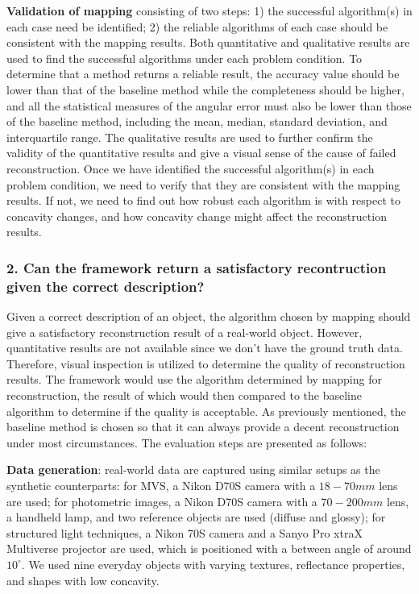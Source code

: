 \noindent\textbf{Validation of mapping}  consisting of two steps: 1) the successful algorithm(s) in each case need be identified; 2) the reliable algorithms of each case should be consistent with the mapping results. Both quantitative and qualitative results are used to find the successful algorithms under each problem condition. To determine that a method returns a reliable result, the accuracy value should be lower than that of the baseline method while the completeness should be higher, and all the statistical measures of the angular error must also be lower than those of the baseline method, including the mean, median, standard deviation, and interquartile range. The qualitative results are used to further confirm the validity of the quantitative results and give a visual sense of the cause of failed reconstruction. Once we have identified the successful algorithm(s) in each problem condition, we need to verify that they are consistent with the mapping results. If not, we need to find out how robust each algorithm is with respect to concavity changes, and how concavity change might affect the reconstruction results.

\subsubsection{2. Can the framework return a satisfactory recontruction given the correct description?}
Given a correct description of an object, the algorithm chosen by mapping should give a satisfactory reconstruction result of a real-world object. However, quantitative results are not available since we don't have the ground truth data. Therefore, visual inspection is utilized to determine the quality of reconstruction results. The framework would use the algorithm determined by mapping for reconstruction, the result of which would then compared to the baseline algorithm to determine if the quality is acceptable. As previously mentioned, the baseline method is chosen so that it can always provide a decent reconstruction under most circumstances. The evaluation steps are presented as follows:

\noindent\textbf{Data generation}: real-world data are captured using similar setups as the synthetic counterparts: for MVS, a Nikon D70S camera with a $18-70mm$ lens are used; for photometric images, a Nikon D70S camera with a $70-200mm$ lens, a handheld lamp, and two reference objects are used (diffuse and glossy); for structured light techniques, a Nikon 70S camera and a Sanyo Pro xtraX Multiverse projector are used, which is positioned with a between angle of around $10^\circ$. We used nine everyday objects with varying textures, reflectance properties, and shapes with low concavity.

